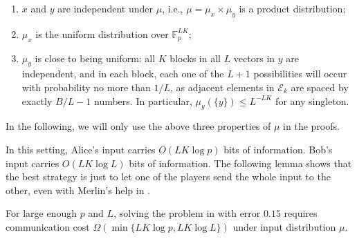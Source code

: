 \documentclass[11pt]{article}
\begin{document}
{\begin{enumerate}
	\item
		$x$ and $y$ are independent under $\mu$, i.e., $\mu=\mu_x\times \mu_y$ is a product distribution;
	\item
		$\mu_x$ is the uniform distribution over $\mathbb{F}_p^{LK}$;
	\item
		$\mu_y$ is close to being uniform: all $K$ blocks in all $L$ vectors in $y$ are independent, and in each block, each one of the $L+1$ possibilities will occur with probability no more than $1/L$, as adjacent elements in $\mathcal{E}_k$ are spaced by exactly $B/L-1$ numbers. In particular, $\mu_y(\{y\})\leq L^{-LK}$ for any singleton. 
\end{enumerate}

In the following, we will only use the above three properties of $\mu$ in the proofs. }
In this setting, Alice's input carries $O(LK\log p)$ bits of information. Bob's input carries $O(LK\log L)$ bits of information. The following lemma shows that the best strategy is just to let one of the players send the whole input to the other, even with Merlin's help in \mm{}.


\begin{lemma}\label{lowermi}
For large enough $p$ and $L$, solving the \mi{} problem in \mm{} with error $0.15$ requires communication cost $\Omega\left(\min\{LK\log p, LK\log L\}\right)$ under input distribution $\mu$.
\end{lemma}
\end{document}
